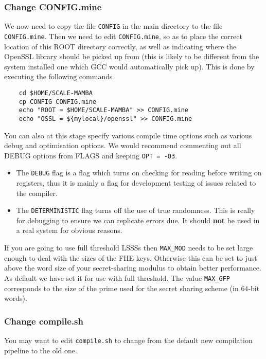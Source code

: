 \subsubsection{Change CONFIG.mine}
\label{sec:CONFIG}
We now need to copy the file \verb+CONFIG+ in the main directory to the file
\verb+CONFIG.mine+.
Then we need to edit \verb+CONFIG.mine+, so as to place the correct
location of this ROOT directory correctly,
as well as indicating where the OpenSSL library should be picked up
from (this is likely to be different from the
system installed one which GCC would automatically pick up).
This is done by executing the following commands
\begin{verbatim}
    cd $HOME/SCALE-MAMBA
    cp CONFIG CONFIG.mine
    echo "ROOT = $HOME/SCALE-MAMBA" >> CONFIG.mine
    echo "OSSL = ${mylocal}/openssl" >> CONFIG.mine
\end{verbatim}
You can also at this stage specify various compile time options
such as various debug and optimisation options.
We would recommend commenting out all DEBUG options from FLAGS
and keeping \verb+OPT = -O3+.
\begin{itemize}
\item The \verb+DEBUG+ flag is a flag which turns on checking for
reading before writing on registers, thus it is mainly a flag
for development testing of issues related to the compiler.
\item The \verb+DETERMINISTIC+ flag turns off the use of true randomness.
This is really for debugging to ensure we can replicate errors due.
It should {\bf not} be used in a real system for obvious reasons.
\end{itemize}
If you are going to use full threshold LSSSs then \verb+MAX_MOD+
needs to be set large enough to deal with the sizes of the FHE
keys. Otherwise this can be set to just above the word size of your
secret-sharing modulus to obtain better performance.
As default we have set it for use with full threshold.
The value \verb+MAX_GFP+ corresponds to the size of the
prime used for the secret sharing scheme (in $64$-bit words).

\subsubsection{Change compile.sh}
\label{sec:compilesh}
You may want to edit \verb+compile.sh+ to change from
the default new compilation pipeline to the old one.


